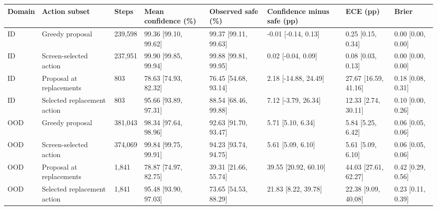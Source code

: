 \begin{tabular}{llllllll}
\toprule
Domain & Action subset & Steps & Mean confidence (\%) & Observed safe (\%) & Confidence minus safe (pp) & ECE (pp) & Brier \\
\midrule
ID & Greedy proposal & 239,598 & 99.36 [99.10, 99.62] & 99.37 [99.11, 99.63] & -0.01 [-0.14, 0.13] & 0.25 [0.15, 0.34] & 0.00 [0.00, 0.00] \\
ID & Screen-selected action & 237,951 & 99.90 [99.85, 99.94] & 99.88 [99.81, 99.95] & 0.02 [-0.04, 0.09] & 0.08 [0.03, 0.13] & 0.00 [0.00, 0.00] \\
ID & Proposal at replacements & 803 & 78.63 [74.93, 82.32] & 76.45 [54.68, 93.14] & 2.18 [-14.88, 24.49] & 27.67 [16.59, 41.16] & 0.18 [0.08, 0.31] \\
ID & Selected replacement action & 803 & 95.66 [93.89, 97.31] & 88.54 [68.46, 99.88] & 7.12 [-3.79, 26.34] & 12.33 [2.74, 30.11] & 0.10 [0.00, 0.26] \\
OOD & Greedy proposal & 381,043 & 98.34 [97.64, 98.96] & 92.63 [91.70, 93.47] & 5.71 [5.10, 6.34] & 5.84 [5.25, 6.42] & 0.06 [0.05, 0.06] \\
OOD & Screen-selected action & 374,069 & 99.84 [99.75, 99.91] & 94.23 [93.74, 94.75] & 5.61 [5.09, 6.10] & 5.61 [5.09, 6.10] & 0.06 [0.05, 0.06] \\
OOD & Proposal at replacements & 1,841 & 78.87 [74.97, 82.75] & 39.31 [21.66, 55.74] & 39.55 [20.92, 60.10] & 44.03 [27.61, 62.27] & 0.42 [0.29, 0.56] \\
OOD & Selected replacement action & 1,841 & 95.48 [93.90, 97.03] & 73.65 [54.53, 88.29] & 21.83 [8.22, 39.78] & 22.38 [9.09, 40.08] & 0.23 [0.11, 0.39] \\
\bottomrule
\end{tabular}
